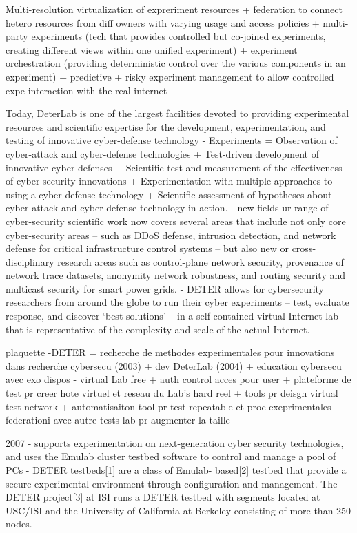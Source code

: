Multi-resolution virtualization of expreriment resources + federation to connect hetero resources from diff owners with varying usage and access policies + multi-party experiments (tech that provides controlled but co-joined experiments, creating different views within one unified experiment) + experiment orchestration (providing deterministic control over the various components in an experiment) + predictive + risky experiment management to allow controlled expe interaction with the real internet

Today, DeterLab is one of the largest facilities devoted to providing experimental resources and scientific expertise for the development, experimentation, and testing of innovative cyber-defense technology
- Experiments =  Observation of cyber-attack and cyber-defense technologies + Test-driven development of innovative cyber-defenses + Scientific test and measurement of the effectiveness of cyber-security innovations + Experimentation with multiple approaches to using a cyber-defense technology + Scientific assessment of hypotheses about cyber-attack and cyber-defense technology in action.
- new fields     ur range of cyber-security scientific work now covers several areas that include not only core cyber-security areas – such as DDoS defense, intrusion detection, and network defense for critical infrastructure control systems – but also new or cross-disciplinary research areas such as control-plane network security, provenance of network trace datasets, anonymity network robustness, and routing security and multicast security for smart power grids.
- DETER allows for cybersecurity researchers from around the globe to run their cyber experiments – test, evaluate response, and discover ‘best solutions’ – in a self-contained virtual Internet lab that is representative of the complexity and scale of the actual Internet.

plaquette
-DETER = recherche de methodes experimentales pour innovations dans recherche cybersecu (2003) + dev DeterLab (2004) + education cybersecu avec exo dispos
- virtual Lab free + auth control acces pour user + plateforme de test pr creer hote virtuel et reseau du Lab's hard reel + tools pr deisgn  virtual test network + automatisaiton tool pr test repeatable et proc exeprimentales + federationi avec autre tests lab pr augmenter la taille

2007
- supports experimentation on next-generation cyber security technologies, and
uses the Emulab cluster testbed software to control and manage a pool of PCs
- DETER testbeds[1] are a class of Emulab- based[2] testbed that provide a
secure experimental environment through configuration and management.  The DETER
project[3] at ISI runs a DETER testbed with segments located at USC/ISI and the
University of California at Berkeley consisting of more than 250 nodes.


